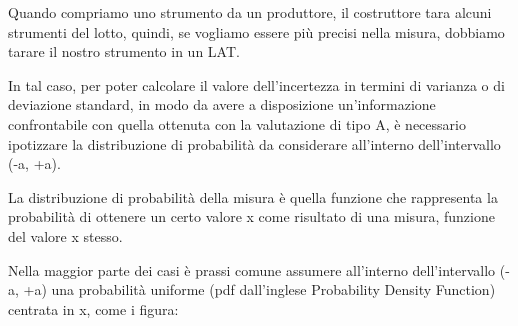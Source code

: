 Quando compriamo uno strumento da un produttore, 
il costruttore tara alcuni strumenti del lotto, 
quindi, se vogliamo essere più precisi nella misura, 
dobbiamo tarare il nostro strumento in un LAT. \newline

In tal caso, per poter calcolare il valore dell'incertezza in termini di varianza o di deviazione standard, 
in modo da avere a disposizione un'informazione confrontabile con quella ottenuta con la valutazione di tipo A, 
è necessario ipotizzare la distribuzione di probabilità da considerare all'interno dell'intervallo (-a, +a). \newline 

La distribuzione di probabilità della misura è quella funzione che rappresenta 
la probabilità di ottenere un certo valore x come risultato di una misura, funzione del valore x stesso. \newline 

Nella maggior parte dei casi è prassi comune assumere all'interno dell'intervallo 
(-a, +a) una probabilità uniforme (pdf dall'inglese Probability Density Function) centrata in x, come i figura:

    \begin{center}
    \end{center}
    
